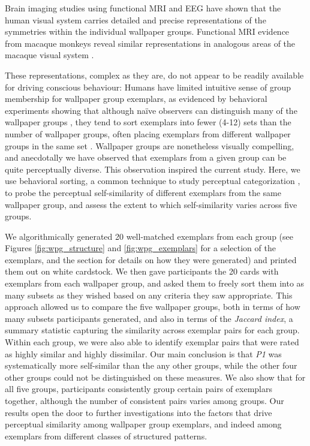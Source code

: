 \documentclass[11pt, twoside]{article}
\begin{document}
Brain imaging studies using functional MRI \citep{RN1725} and EEG \citep{RN1959,kohler_clarke_2021} have shown that the human visual system carries detailed and precise representations of the symmetries within the individual wallpaper groups. Functional MRI evidence from macaque monkeys reveal similar representations in analogous areas of the macaque visual system \citep{audurier_symmetry_2021}.

These representations, complex as they are, do not appear to be readily available for driving conscious behaviour: Humans have limited intuitive sense of group membership for wallpaper group exemplars, as evidenced by behavioral experiments showing that although naïve observers can distinguish many of the wallpaper groups \citep{RN1253}, they tend to sort exemplars into fewer (4-12) sets than the number of wallpaper groups, often placing exemplars from different wallpaper groups in the same set \citep{RN172}. Wallpaper groups are nonetheless visually compelling, and anecdotally we have observed that exemplars from a given group can be quite perceptually diverse. This observation inspired the current study. Here, we use behavioral sorting, a common technique to study perceptual categorization \citep{Milton2008-ez,Pothos2011-vi}, to probe the perceptual self-similarity of different exemplars from the same wallpaper group, and assess the extent to which self-similarity varies across five groups. 

We algorithmically generated 20 well-matched exemplars from each group (see Figures \ref{fig:wpg_structure} and \ref{fig:wpg_exemplars} for a selection of the exemplars, and the  section for details on how they were generated) and printed them out on white cardstock. We then gave participants the 20 cards with exemplars from each wallpaper group, and asked them to freely sort them into as many subsets as they wished based on any criteria they saw appropriate. This approach allowed us to compare the five wallpaper groups, both in terms of how many subsets participants generated, and also in terms of the \textit{Jaccard index}, a summary statistic capturing the similarity across exemplar pairs for each group. Within each group, we were also able to identify exemplar pairs that were rated as highly similar and highly dissimilar. Our main conclusion is that \textit{P1} was systematically more self-similar than the any other groups, while the other four other groups could not be distinguished on these measures. We also show that for all five groups, participants consistently group certain pairs of exemplars together, although the number of consistent pairs varies among groups. Our results open the door to further investigations into the factors that drive perceptual similarity among wallpaper group exemplars, and indeed among exemplars from different classes of structured patterns. 
\end{document}
